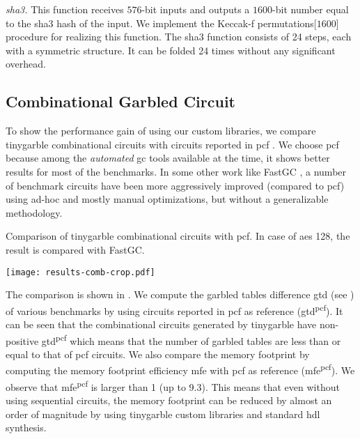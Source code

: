 \textit{\acrshort{sha}3.} This function receives $576$-bit inputs and outputs a $1600$-bit number equal to the \acrshort{sha}3 hash of the input.
We implement the Keccak-f permutations[$1600$] procedure for realizing this function.
The \acrshort{sha}3 function consists of 24 steps, each with a symmetric structure.
It can be folded 24 times without any significant overhead.

\subsection{Combinational Garbled Circuit}\label{ssec:eval-tinygarble-comb}
To show the performance gain of using our custom libraries, we compare \gls{tinygarble} combinational circuits with circuits reported in \gls{pcf} \cite{kreuter2013pcf}.
We choose \gls{pcf} because among the \emph{automated} \acrshort{gc} tools available at the time, it shows better results for most of the benchmarks.
In some other work like FastGC \cite{huang2011faster}, a number of benchmark circuits have been more aggressively improved (compared to \gls{pcf}) using ad-hoc and mostly manual optimizations, but without a generalizable methodology.

\begin{table}
\centering
\caption{Comparison of \gls{tinygarble} combinational circuits with \gls{pcf}.
In case of \acrshort{aes} 128, the result is compared with FastGC.}
\label{table:result-comb}
\texttt{[image: results-comb-crop.pdf]}
\end{table}

The comparison is shown in .
We compute the garbled tables difference \acrshort{gtd} (see ) of various benchmarks by using circuits reported in \gls{pcf} as reference (\acrshort{gtd}\textsuperscript{\gls{pcf}}).
It can be seen that the combinational circuits generated by \gls{tinygarble} have non-positive \acrshort{gtd}\textsuperscript{\gls{pcf}} which means that the number of garbled tables are less than or equal to that of \gls{pcf} circuits.
We also compare the memory footprint by computing the memory footprint efficiency \acrshort{mfe} with \gls{pcf} as reference (\acrshort{mfe}\textsuperscript{\gls{pcf}}).
We observe that \acrshort{mfe}\textsuperscript{\gls{pcf}} is larger than 1 (up to 9.3).
This means that even without using sequential circuits, the memory footprint can be reduced by almost an order of magnitude by using \gls{tinygarble} custom libraries and standard \acrshort{hdl} synthesis.

